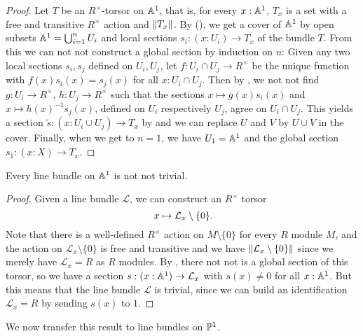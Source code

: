 \begin{proof}
  Let $T$ be an $R^\times$-torsor on $\mathbb{A}^1$,
  that is,
  for every $x : \mathbb{A}^1$,
  $T_x$ is a set with a free and transitive $R^\times$ action
  and $\lVert T_x \rVert$.
  By (),
  we get a cover of $\mathbb{A}^1$ by open subsets $\mathbb{A}^1 = \bigcup_{i = 1}^n U_i$
  and local sections $s_i : (x : U_i) \to T_x$ of the bundle $T$.
  From this we can not not construct a global section by induction on $n$:
  Given any two local sections $s_i, s_j$ defined on $U_i, U_j$,
  let $f : U_i \cap U_j \to R^\times$ be the unique function with
  $f(x)s_i(x) = s_j(x)$ for all $x : U_i \cap U_j$.
  Then by ,
  we not not find $g : U_i \to R^\times$, $h : U_j \to R^\times$
  such that the sections
  $x \mapsto g(x)s_i(x)$ and $x \mapsto {h(x)}^{-1}s_j(x)$,
  defined on $U_i$ respectively $U_j$,
  agree on $U_i \cap U_j$.
  This yields a section $\widetilde{s} : (x : U_i \cup U_j) \to T_x$
  by 
  and we can replace $U$ and $V$ by $U \cup V$ in the cover.
  Finally, when we get to $n = 1$,
  we have $U_1 = \mathbb{A}^1$
  and the global section $s_1 : (x : X) \to T_x$.
\end{proof}

\begin{corollary}
  \label{line-bundle-A1-notnot-trivial}
  Every line bundle on $\mathbb{A}^1$ is not not trivial.
\end{corollary}

\begin{proof}
  Given a line bundle $\mathcal{L}$,
  we can construct an $R^\times$ torsor
  \[ x \mapsto \mathcal{L}_x \setminus \{0\} \rlap{.} \]
  Note that there is a well-defined $R^\times$ action on $M \setminus \{0\}$
  for every $R$ module $M$,
  and the action on $\mathcal{L}_x \setminus \{0\}$ is free and transitive
  and we have $\lVert \mathcal{L}_x \setminus \{0\} \rVert$
  since we merely have $\mathcal{L}_x = R$ as $R$ modules.
  By ,
  there not not is a global section of this torsor,
  so we have a section $s : (x : \mathbb{A}^1) \to \mathcal{L}_x$
  with $s(x) \neq 0$ for all $x : \mathbb{A}^1$.
  But this means that the line bundle $\mathcal{L}$ is trivial,
  since we can build an identification $\mathcal{L}_x = R$
  by sending $s(x)$ to $1$.
\end{proof}

We now transfer this result to line bundles on $\mathbb{P}^1$.

